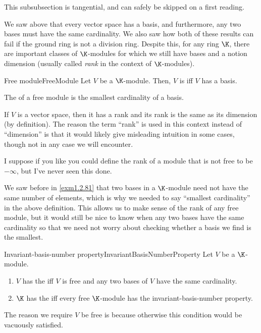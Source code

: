 \begin{rmk}
	This subsubsection is tangential, and can safely be skipped on a first reading.
\end{rmk}
We saw above that every vector space has a basis, and furthermore, any two bases must have the same cardinality.  We also saw how both of these results can fail if the ground ring is not a division ring.  Despite this, for any ring $\K$, there are important classes of $\K$-modules for which we still have bases and a notion dimension (usually called \emph{rank} in the context of $\K$-modules).
\begin{dfn}{Free module}{FreeModule}
	Let $V$ be a $\K$-module.  Then, $V$ is  iff $V$ has a basis.
	
	The  of a free module is the smallest cardinality of a basis.
	\begin{rmk}
		If $V$ is a vector space, then it has a rank and its rank is the same as its dimension (by definition).  The reason the term ``rank'' is used in this context instead of ``dimension'' is that it would likely give misleading intuition in some cases, though not in any case we will encounter.
	\end{rmk}
	\begin{rmk}
		I suppose if you like you could define the rank of a module that is not free to be $-\infty$, but I've never seen this done.
	\end{rmk}
\end{dfn}
We saw before in \cref{exm1.2.81} that two bases in a $\K$-module need not have the same number of elements, which is why we needed to say ``smallest cardinality'' in the above definition.  This allows us to make sense of the rank of any free module, but it would still be nice to know when any two bases have the same cardinality so that we need not worry about checking whether a basis we find is the smallest.
\begin{dfn}{Invariant-basis-number property}{InvariantBasisNumberProperty}
	Let $V$ be a $\K$-module.
	\begin{enumerate}
		\item $V$ has the  iff $V$ is free and any two bases of $V$ have the same cardinality.
		\item $\K$ has the  iff every free $\K$-module has the invariant-basis-number property.
	\end{enumerate}
	\begin{rmk}
		The reason we require $V$ be free is because otherwise this condition would be vacuously satisfied.
	\end{rmk}
\end{dfn}
